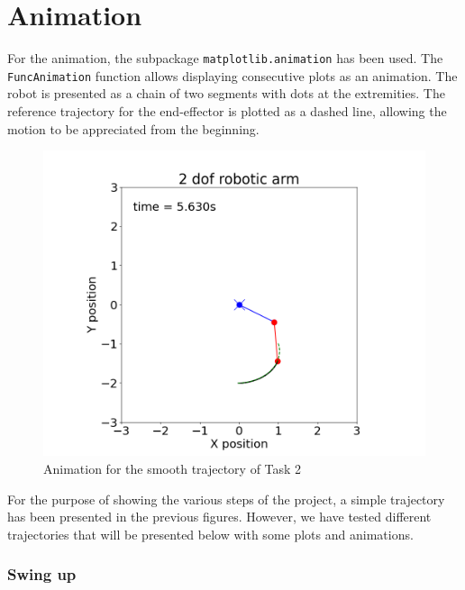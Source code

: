 \chapter*{Animation}

For the animation, the subpackage \texttt{matplotlib.animation} has been used. The \texttt{FuncAnimation} function allows displaying consecutive plots as an animation. The robot is presented as a chain of two segments with dots at the extremities. The reference trajectory for the end-effector is plotted as a dashed line, allowing the motion to be appreciated from the beginning.

\begin{figure}[H]
    \centering
    \includegraphics[width=0.8\linewidth]{figs/downward_video_0.png}
    \caption{Animation for the smooth trajectory of Task 2}
    \label{fig:downward_video_0}
\end{figure}


For the purpose of showing the various steps of the project, a simple trajectory has been presented in the previous figures. However, we have tested different trajectories that will be presented below with some plots and animations.

\subsection*{Swing up}

